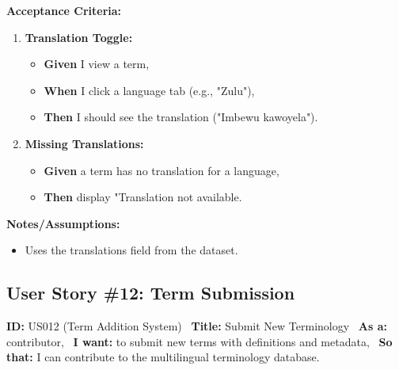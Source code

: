 \documentclass[12pt]{article}
\begin{document}
\vspace{1em}
\textbf{Acceptance Criteria:}
\begin{enumerate}
    \item \textbf{Translation Toggle:}
    \begin{itemize}
        \item \textbf{Given} I view a term,
        \item \textbf{When} I click a language tab (e.g., "Zulu"),
        \item \textbf{Then}  I should see the translation ("Imbewu kawoyela").
    \end{itemize}

    \item \textbf{Missing Translations:}
    \begin{itemize}
        \item \textbf{Given} a term has no translation for a language,
        \item \textbf{Then} display "Translation not available.
    \end{itemize}

\end{enumerate}

\vspace{1em}
\textbf{Notes/Assumptions:}
\begin{itemize}
    \item Uses the translations field from the dataset.
\end{itemize}

\subsection{User Story \#12: Term Submission}
\textbf{ID:} US012 (Term Addition System) \
\textbf{Title:} Submit New Terminology \
\textbf{As a:} contributor, \
\textbf{I want:} to submit new terms with definitions and metadata, \
\textbf{So that:} I can contribute to the multilingual terminology database.
\end{document}
